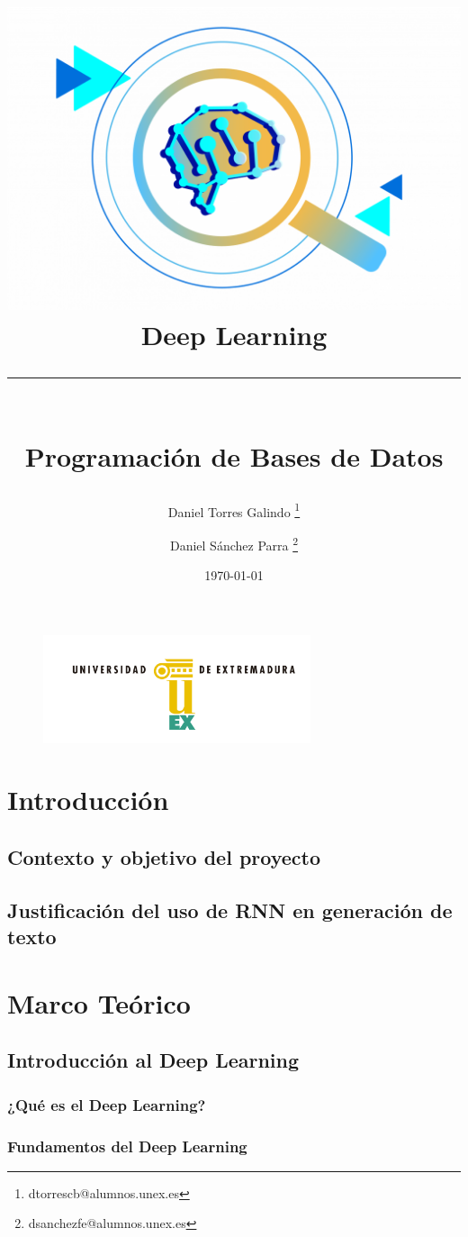 \documentclass{article}
\title{
\includegraphics[scale=0.4]{deep-learning.png} \\
\vspace{2em}
\textbf{Deep Learning} \\ \rule{0.8\textwidth}{0.5pt} \\ \large \textbf{Programación de Bases de Datos}}
\author{Daniel Torres Galindo \thanks{dtorrescb@alumnos.unex.es} \and Daniel Sánchez Parra \thanks{dsanchezfe@alumnos.unex.es}}
\date{\today}
\begin{document}
\maketitle

\thispagestyle{empty}

\begin{figure}[H]
    \centering
    \includegraphics[width=0.7\textwidth]{logo-uex.png}
\end{figure}

\renewcommand{\footnoterule}{
    \vspace{1em}
    \hrule width \linewidth height 0.5pt
    \vspace{0.5em}
}

\newpage

\tableofcontents

\section{Introducción}
\subsection{Contexto y objetivo del proyecto}
\subsection{Justificación del uso de RNN en generación de texto}

\section{Marco Teórico}
\subsection{Introducción al Deep Learning}
\subsubsection{¿Qué es el Deep Learning?}
\subsubsection{Fundamentos del Deep Learning}
\end{document}
